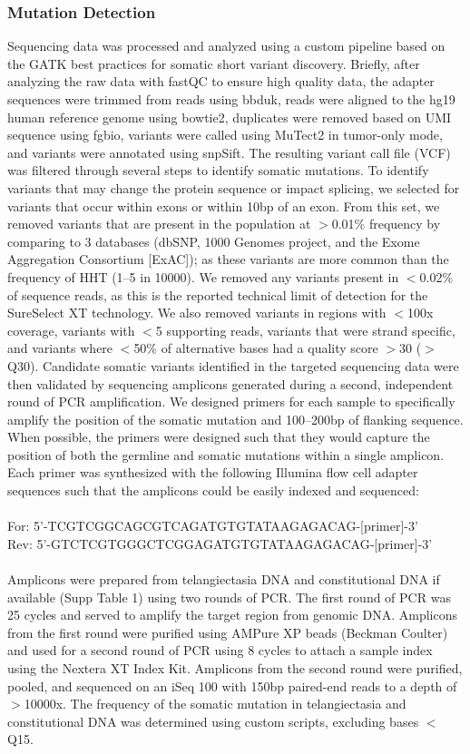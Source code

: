 \subsubsection{Mutation Detection}
Sequencing data was processed and analyzed using a custom pipeline based on the GATK best practices for somatic short variant discovery. Briefly, after analyzing the raw data with fastQC to ensure high quality data, the adapter sequences were trimmed from reads using bbduk, reads were aligned to the hg19 human reference genome using bowtie2, duplicates were removed based on UMI sequence using fgbio, variants were called using MuTect2 in tumor-only mode, and variants were annotated using snpSift. The resulting variant call file (VCF) was filtered through several steps to identify somatic mutations. To identify variants that may change the protein sequence or impact splicing, we selected for variants that occur within exons or within 10bp of an exon. From this set, we removed variants that are present in the population at $>$0.01\% frequency by comparing to 3 databases (dbSNP, 1000 Genomes project, and the Exome Aggregation Consortium [ExAC]); as these variants are more common than the frequency of HHT (1--5 in 10000).\citep{grosse2014} We removed any variants present in $<$0.02\% of sequence reads, as this is the reported technical limit of detection for the SureSelect XT technology. We also removed variants in regions with $<$100x coverage, variants with $<$5 supporting reads, variants that were strand specific, and variants where $<$50\% of alternative bases had a quality score $>$30 ($>$Q30). 
	Candidate somatic variants identified in the targeted sequencing data were then validated by sequencing amplicons generated during a second, independent round of PCR amplification. We designed primers for each sample to specifically amplify the position of the somatic mutation and 100--200bp of flanking sequence. When possible, the primers were designed such that they would capture the position of both the germline and somatic mutations within a single amplicon. Each primer was synthesized with the following Illumina flow cell adapter sequences such that the amplicons could be easily indexed and sequenced: 
	\\
	\\For: 5’-TCGTCGGCAGCGTCAGATGTGTATAAGAGACAG‐[primer]-3’
	\\Rev: 5’-GTCTCGTGGGCTCGGAGATGTGTATAAGAGACAG‐[primer]-3’
	\\\\
	Amplicons were prepared from telangiectasia DNA and constitutional DNA if available (Supp Table 1) using two rounds of PCR. The first round of PCR was 25 cycles and served to amplify the target region from genomic DNA. Amplicons from the first round were purified using AMPure XP beads (Beckman Coulter) and used for a second round of PCR using 8 cycles to attach a sample index using the Nextera XT Index Kit. Amplicons from the second round were purified, pooled, and sequenced on an iSeq 100 with 150bp paired-end reads to a depth of $>$10000x. The frequency of the somatic mutation in telangiectasia and constitutional DNA was determined using custom scripts, excluding bases $<$Q15. 
